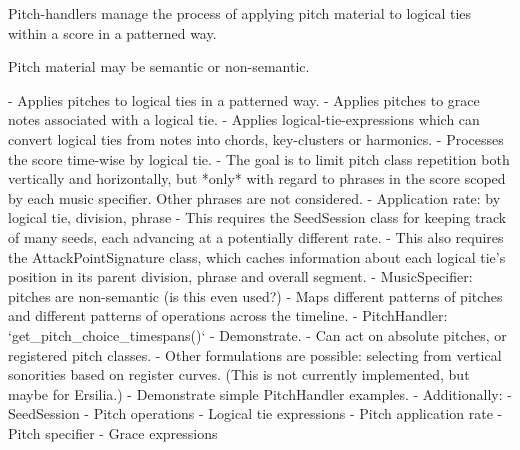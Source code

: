 Pitch-handlers manage the process of applying pitch material to logical ties
within a score in a patterned way.

Pitch material may be semantic or non-semantic.

\begin{markdown}
-   Applies pitches to logical ties in a patterned way.
-   Applies pitches to grace notes associated with a logical tie.
-   Applies logical-tie-expressions which can convert logical ties from
    notes into chords, key-clusters or harmonics.
-   Processes the score time-wise by logical tie.
    -   The goal is to limit pitch class repetition both vertically and
        horizontally, but *only* with regard to phrases in the score scoped
        by each music specifier. Other phrases are not considered.
-   Application rate: by logical tie, division, phrase
    -   This requires the SeedSession class for keeping track of many
        seeds, each advancing at a potentially different rate.
    -   This also requires the AttackPointSignature class, which caches
        information about each logical tie's position in its parent
        division, phrase and overall segment.
-   MusicSpecifier: pitches are non-semantic (is this even used?)
-   Maps different patterns of pitches and different patterns of operations
    across the timeline.
    -   PitchHandler: `get_pitch_choice_timespans()`
    -   Demonstrate.
-   Can act on absolute pitches, or registered pitch classes.
-   Other formulations are possible: selecting from vertical sonorities
    based on register curves. (This is not currently implemented, but maybe
    for Ersilia.)
-   Demonstrate simple PitchHandler examples.
-   Additionally:
    -   SeedSession
    -   Pitch operations
    -   Logical tie expressions
    -   Pitch application rate
    -   Pitch specifier
    -   Grace expressions
\end{markdown}

\begin{comment}
<abjad>[stylesheet=../consort.ily]
segment_maker = consort.SegmentMaker(
    desired_duration_in_seconds=9,
    #omit_stylesheets=True,
    permitted_time_signatures=[(3, 4)],
    score_template=templatetools.GroupedStavesScoreTemplate(
        staff_count=2,
        ),
    tempo=indicatortools.Tempo((1, 4), 60),
    )
music_specifier = consort.MusicSpecifier(
    rhythm_maker=rhythmmakertools.TaleaRhythmMaker(
        talea=rhythmmakertools.Talea([1], 16),
        ),
    )
timespan_maker = consort.TaleaTimespanMaker(
    initial_silence_talea=rhythmmakertools.Talea([0, 1], 4),
    playing_talea=rhythmmakertools.Talea([1], 8),
    playing_groupings=[3],
    silence_talea=rhythmmakertools.Talea([1], 8),
    )
segment_maker.add_setting(
    timespan_maker=timespan_maker,
    v1=music_specifier,
    v2=music_specifier,
    )
show(segment_maker, verbose=False)
</abjad>
\end{comment}


